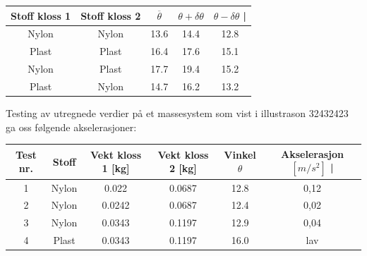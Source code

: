 \documentclass[10pt,a4paper]{report}
\begin{document}
\begin{center}
  \begin{tabular}{| c | c | c | c | c |}
    \hline
    Stoff kloss 1 & Stoff kloss 2 & $\overline{\theta}$ & $\theta + \delta\theta$ & $\theta - \delta\theta$ | \\ \hline
    Nylon & Nylon & 13.6 & 14.4 & 12.8 \\ \hline
    Plast & Plast & 16.4 & 17.6 & 15.1 \\ \hline
    Nylon & Plast & 17.7 & 19.4 & 15.2 \\ \hline
    Plast & Nylon & 14.7 & 16.2 & 13.2  \\ \hline
  \end{tabular}
\end{center}
Testing av utregnede verdier på et massesystem som vist i illustrason 32432423 ga oss følgende akselerasjoner:

\begin{center}
  \begin{tabular}{| c | c | c | c | c  | c |}
    \hline
    Test nr. & Stoff & Vekt kloss 1 [kg] & Vekt kloss 2 [kg] & Vinkel $\theta$ & Akselerasjon $[m/s^2]$ | \\ \hline
    1 & Nylon & 0.022 & 0.0687 & 12.8 & 0,12 \\ \hline
    2 & Nylon & 0.0242 & 0.0687 & 12.4 & 0,02 \\ \hline
    3 & Nylon & 0.0343 & 0.1197 & 12.9 & 0,04 \\ \hline
    4 & Plast & 0.0343 & 0.1197 & 16.0 & lav  \\ \hline
  \end{tabular}
\end{center}
\end{document}
